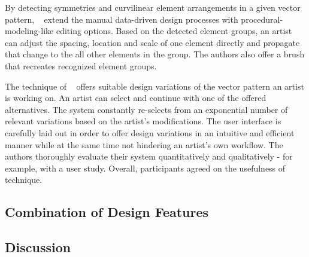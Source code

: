 By detecting symmetries and curvilinear element arrangements in a given vector pattern, \citeauthor*{yeh_2009_dsa}~\cite{yeh_2009_dsa} extend the manual data-driven design processes with procedural-modeling-like editing options. Based on the detected element groups, an artist can adjust the spacing, location and scale of one element directly and propagate that change to the all other elements in the group. The authors also offer a brush that recreates recognized element groups.

The technique of \citeauthor*{guerrero_2016_pep}~\cite{guerrero_2016_pep} offers suitable design variations of the vector pattern an artist is working on. An artist can select and continue with one of the offered alternatives. The system constantly re-selects from an exponential number of relevant variations based on the artist's modifications. The user interface is carefully laid out in order to offer design variations in an intuitive and efficient manner while at the same time not hindering an artist's own workflow. The authors thoroughly evaluate their system quantitatively and qualitatively - for example, with a user study. Overall, participants agreed on the usefulness of technique.




\subsection{Combination of Design Features}
\label{subsec:analysis_combination_of_design_features}



\subsection{Discussion}
\label{subsec:analysis_discussion}




